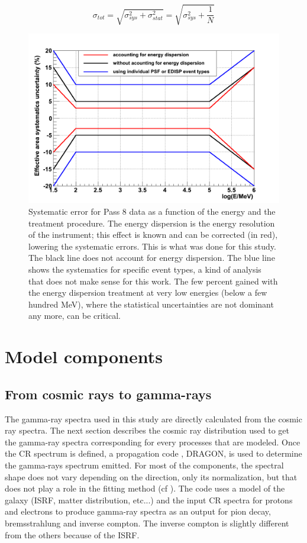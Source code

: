 \begin{equation}
\sigma_{tot} =\sqrt{\sigma_{sys}^2 + \sigma_{stat}^2} = \sqrt{\sigma_{sys}^2 + \frac{1}{N}}
\end{equation}


\begin{figure}[h]
 \centering
 \includegraphics[width=.5\linewidth]{pic/method/LAT_sys_error.png}
 \caption{Systematic error for Pass 8 data as a function of the energy and the treatment procedure. The energy dispersion is the energy resolution of the instrument; this effect is known and can be corrected (in red), lowering the systematic errors. This is what was done for this study. The black line does not account for energy dispersion. The blue line shows the systematics for specific event types, a kind of analysis that does not make sense for this work. The few percent gained with the energy dispersion treatment at very low energies (below a few hundred MeV), where the statistical uncertainties are not dominant any more, can be critical.}
 \label{fig:LAT_sys_err}
\end{figure}




\newpage
\section{Model components}
\subsection{From cosmic rays to gamma-rays}

The gamma-ray spectra used in this study are directly calculated from the cosmic ray spectra. The next section describes the cosmic ray distribution used to get the gamma-ray spectra corresponding for every processes that are modeled. Once the CR spectrum is defined, a propagation code , DRAGON, is used to determine the gamma-rays spectrum emitted. For most of the components, the spectral shape does not vary depending on the direction, only its normalization, but that does not play a role in the fitting method (cf ).
The code uses a model of the galaxy (ISRF, matter distribution, etc...) and the input CR spectra for protons and electrons to produce gamma-ray spectra as an output for pion decay, bremsstrahlung and inverse compton. The inverse compton is slightly different from the others because of the ISRF.


